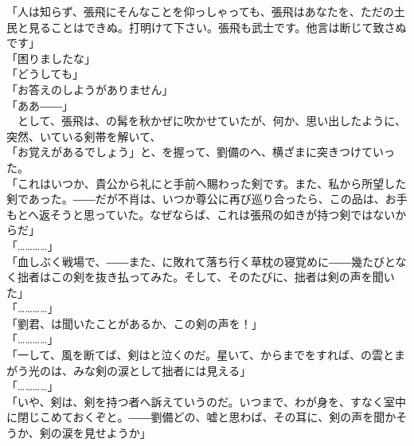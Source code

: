 \documentclass[
  paper=a5,
  fontsize=10pt,
  jafontsize=9.5pt,
  tate,                  %
  open_bracket_pos=nibu, %
]{jlreq}
\begin{document}
「人は知らず、張飛にそんなことを仰っしゃっても、張飛はあなたを、ただの土民と見ることはできぬ。打明けて下さい。張飛も武士です。他言は断じて致さぬです」\\


「困りましたな」\\


「どうしても」\\


「お答えのしようがありません」\\


「ああ――」\\


　として、張飛は、の髯を秋かぜに吹かせていたが、何か、思い出したように、突然、いている剣帯を解いて、\\


「お覚えがあるでしょう」と、を握って、劉備のへ、横ざまに突きつけていった。\\


「これはいつか、貴公から礼にと手前へ賜わった剣です。また、私から所望した剣であった。――だが不肖は、いつか尊公に再び巡り合ったら、この品は、お手もとへ返そうと思っていた。なぜならば、これは張飛の如きが持つ剣ではないからだ」\\


「…………」\\


「血しぶく戦場で、――また、に敗れて落ち行く草枕の寝覚めに――幾たびとなく拙者はこの剣を抜き払ってみた。そして、そのたびに、拙者は剣の声を聞いた」\\


「…………」\\


「劉君、は聞いたことがあるか、この剣の声を！」\\


「…………」\\


「一して、風を断てば、剣はと泣くのだ。星いて、からまでをすれば、の雲とまがう光のは、みな剣の涙として拙者には見える」\\


「…………」\\


「いや、剣は、剣を持つ者へ訴えていうのだ。いつまで、わが身を、すなく室中に閉じこめておくぞと。――劉備どの、嘘と思わば、その耳に、剣の声を聞かそうか、剣の涙を見せようか」\\
\end{document}
